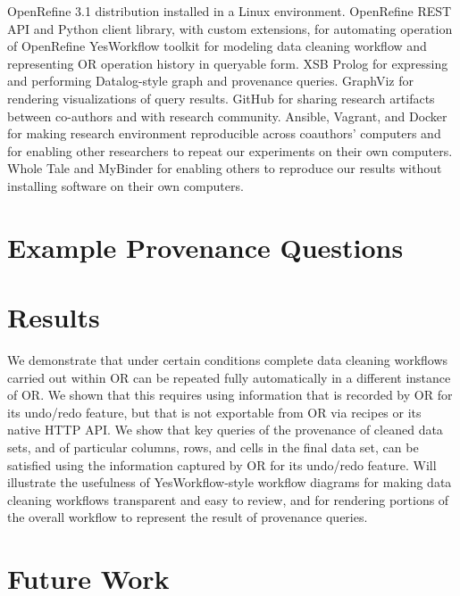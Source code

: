 \documentclass[sigconf,screen,nonacm]{acmart}
\begin{document}
OpenRefine 3.1 distribution installed in a Linux environment.
OpenRefine REST API and Python client library, with custom extensions, for automating operation of OpenRefine
YesWorkflow toolkit for modeling data cleaning workflow and representing OR operation history in queryable form.
XSB Prolog for expressing and performing Datalog-style graph and provenance queries.
GraphViz for rendering visualizations of query results.
GitHub for sharing research artifacts between co-authors and with research community.
Ansible, Vagrant, and Docker for making research environment reproducible across coauthors' computers and for enabling other researchers to repeat our experiments on their own computers.
Whole Tale and MyBinder for enabling others to reproduce our results without installing software on their own computers. 

\section{Example Provenance Questions}

\section{Results}

We demonstrate that under certain conditions complete data cleaning workflows carried out within OR can be repeated fully automatically in a different instance of OR.  We shown that this requires using information that is recorded by OR for its undo/redo feature, but that is not exportable from OR via recipes or its native HTTP API.
We show that key queries of the provenance of cleaned data sets, and of particular columns, rows, and cells in the final data set, can be satisfied using the information captured by OR for its undo/redo feature.
Will illustrate the usefulness of YesWorkflow-style workflow diagrams for making data cleaning workflows transparent and easy to review, and for rendering portions of the overall workflow to represent the result of provenance queries.

\section{Future Work}



%


\end{document}

